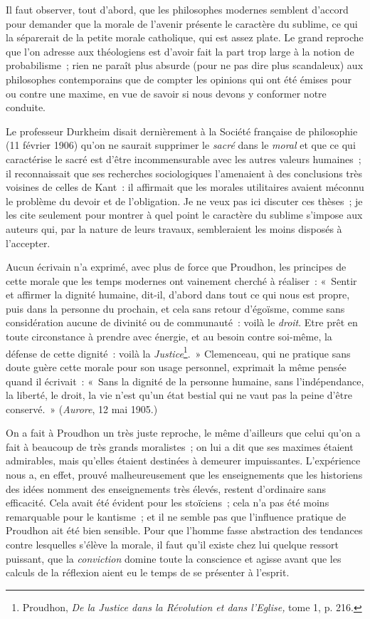 \documentclass[french,twoside]{book} %
\begin{document}
\noindent Il faut observer, tout d’abord, que les philosophes modernes semblent d’accord pour demander que la morale de l’avenir présente le caractère du sublime, ce qui la séparerait de la petite morale catholique, qui est assez plate. Le grand reproche que l’on adresse aux théologiens est d’avoir fait la part trop large à la notion de probabilisme ; rien ne paraît plus absurde (pour ne pas dire plus scandaleux) aux philosophes contemporains que de compter les opinions qui ont été émises pour ou contre une maxime, en vue de savoir si nous devons y conformer notre conduite.\par
Le professeur Durkheim disait dernièrement à la Société française de philosophie (11 février 1906) qu’on ne saurait supprimer le \emph{sacré} dans le \emph{moral} et que ce qui caractérise le sacré est d’être incommensurable avec les autres valeurs humaines ; il reconnaissait que ses recherches sociologiques l’amenaient à des conclusions très voisines de celles de Kant : il affirmait que les morales utilitaires avaient méconnu le problème du devoir et de l’obligation. Je ne veux pas ici discuter ces thèses ; je les cite seulement pour montrer à quel point le caractère du sublime s’impose aux auteurs qui, par la nature de leurs travaux, sembleraient les moins disposés à l’accepter.\par
Aucun écrivain n’a exprimé, avec plus de force que Proudhon, les principes de cette morale que les temps modernes ont vainement cherché à réaliser : « Sentir et affirmer la dignité humaine, dit-il, d’abord dans tout ce  qui nous est propre, puis dans la personne du prochain, et cela sans retour d’égoïsme, comme sans considération aucune de divinité ou de communauté : voilà le \emph{droit}. Etre prêt en toute circonstance à prendre avec énergie, et au besoin contre soi-même, la défense de cette dignité : voilà la \emph{Justice}\footnote{ \noindent Proudhon, \emph{De la Justice dans la Révolution et dans l’Eglise,} tome 1, p. 216.
 }. » Clemenceau, qui ne pratique sans doute guère cette morale pour son usage personnel, exprimait la même pensée quand il écrivait : « Sans la dignité de la personne humaine, sans l’indépendance, la liberté, le droit, la vie n’est qu’un état bestial qui ne vaut pas la peine d’être conservé. » (\emph{Aurore}, 12 mai 1905.)\par
On a fait à Proudhon un très juste reproche, le même d’ailleurs que celui qu’on a fait à beaucoup de très grands moralistes ; on lui a dit que ses maximes étaient admirables, mais qu’elles étaient destinées à demeurer impuissantes. L’expérience nous a, en effet, prouvé malheureusement que les enseignements que les historiens des idées nomment des enseignements très élevés, restent d’ordinaire sans efficacité. Cela avait été évident pour les stoïciens ; cela n’a pas été moins remarquable pour le kantisme ; et il ne semble pas que l’influence pratique de Proudhon ait été bien sensible. Pour que l’homme fasse abstraction des tendances contre lesquelles s’élève la morale, il faut qu’il existe chez lui quelque ressort puissant, que la \emph{conviction} domine toute la conscience et agisse avant que les calculs de la réflexion aient eu le temps de se présenter à l’esprit.\par
\end{document}
